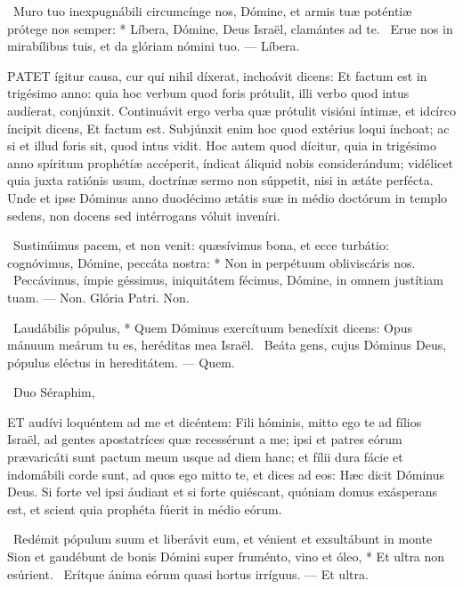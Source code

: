 \R\ Muro tuo inexpugnábili circumcínge nos, Dómine, et armis tuæ poténtiæ prótege nos semper: * Líbera, Dómine, Deus Israël, clamántes ad te. \V\ Erue nos in mirabílibus tuis, et da glóriam nómini tuo. — Líbera.


\lettrine[lines=2]{P}{ATET} ígitur causa, cur qui nihil díxerat, inchoávit dicens: Et factum est in trigésimo anno: quia hoc verbum quod foris prótulit, illi verbo quod intus audíerat, conjúnxit. Continuávit ergo verba quæ prótulit visióni íntimæ, et idcírco íncipit dicens, Et factum est. Subjúnxit enim hoc quod extérius loqui ínchoat; ac si et illud foris sit, quod intus vidit. Hoc autem quod dícitur, quia in trigésimo anno spíritum prophétíæ accéperit, índicat áliquid nobis considerándum; vidélicet quia juxta ratiónis usum, doctrínæ sermo non súppetit, nisi in ætáte perfécta. Unde et ipse Dóminus anno duodécimo ætátis suæ in médio doctórum in templo sedens, non docens sed intérrogans vóluit inveníri.

\R\ Sustinúimus pacem, et non venit: quæsívimus bona, et ecce turbátio: cognóvimus, Dómine, peccáta nostra: * Non in perpétuum obliviscáris nos. \V\ Peccávimus, ímpie géssimus, iniquitátem fécimus, Dómine, in omnem justítiam tuam. — Non. Glória Patri. Non.

\R\ Laudábilis pópulus, * Quem Dóminus exercítuum benedíxit dicens: Opus mánuum meárum tu es, heréditas mea Israël. \V\ Beáta gens, cujus Dóminus Deus, pópulus eléctus in hereditátem. — Quem.

\R\ Duo Séraphim, 




\lettrine[lines=2]{E}{T} audívi loquéntem ad me et dicéntem: Fili hóminis, mitto ego te ad fílios Israël, ad gentes apostatríces quæ recessérunt a me; ipsi et patres eórum prævaricáti sunt pactum meum usque ad diem hanc; et fílii dura fácie et indomábili corde sunt, ad quos ego mitto te, et dices ad eos: Hæc dicit Dóminus Deus. Si forte vel ipsi áudiant et si forte quiéscant, quóniam domus exásperans est, et scient quia prophéta fúerit in médio eórum.

\R\ Redémit pópulum suum et liberávit eum, et vénient et exsultábunt in monte Sion et gaudébunt de bonis Dómini super fruménto, vino et óleo, * Et ultra non esúrient. \V\ Erítque ánima eórum quasi hortus irríguus. — Et ultra.

